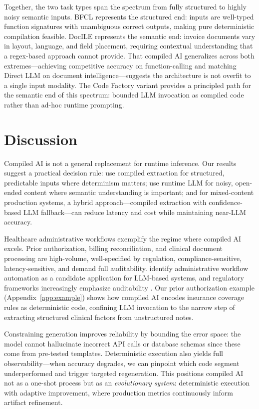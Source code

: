 \documentclass[11pt]{article}
\begin{document}
Together, the two task types span the spectrum from fully structured to highly noisy semantic inputs. BFCL represents the structured end: inputs are well-typed function signatures with unambiguous correct outputs, making pure deterministic compilation feasible. DocILE represents the semantic end: invoice documents vary in layout, language, and field placement, requiring contextual understanding that a regex-based approach cannot provide. That compiled AI generalizes across both extremes---achieving competitive accuracy on function-calling and matching Direct LLM on document intelligence---suggests the architecture is not overfit to a single input modality. The Code Factory variant provides a principled path for the semantic end of this spectrum: bounded LLM invocation as compiled code rather than ad-hoc runtime prompting.

\section{Discussion}
\label{sec:discussion}

Compiled AI is not a general replacement for runtime inference. Our results suggest a practical decision rule: use compiled extraction for structured, predictable inputs where determinism matters; use runtime LLM for noisy, open-ended content where semantic understanding is important; and for mixed-content production systems, a hybrid approach---compiled extraction with confidence-based LLM fallback---can reduce latency and cost while maintaining near-LLM accuracy.

Healthcare administrative workflows exemplify the regime where compiled AI excels. Prior authorization, billing reconciliation, and clinical document processing are high-volume, well-specified by regulation, compliance-sensitive, latency-sensitive, and demand full auditability. \citet{qiu2024healthcare} identify administrative workflow automation as a candidate application for LLM-based systems, and regulatory frameworks increasingly emphasize auditability \citep{fda2025}. Our prior authorization example (Appendix~\ref{app:example}) shows how compiled AI encodes insurance coverage rules as deterministic code, confining LLM invocation to the narrow step of extracting structured clinical factors from unstructured notes.

Constraining generation improves reliability by bounding the error space: the model cannot hallucinate incorrect API calls or database schemas since these come from pre-tested templates. Deterministic execution also yields full observability---when accuracy degrades, we can pinpoint which code segment underperformed and trigger targeted regeneration. This positions compiled AI not as a one-shot process but as an \emph{evolutionary system}: deterministic execution with adaptive improvement, where production metrics continuously inform artifact refinement.
\end{document}
